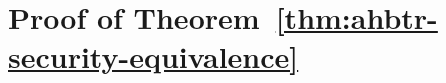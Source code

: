 \documentclass[
  layout=6x9,
  envelope-icons=no,
  format=lncs-submission-draft
]{crypto-paper}
\begin{document}




\LaomianBody















\LaomianAcknowledgments


\LaomianAppendix

% 

\section{Proof of Theorem~\ref{thm:ahbtr-security-equivalence}}
\label{sec:deferred}


\end{document}
